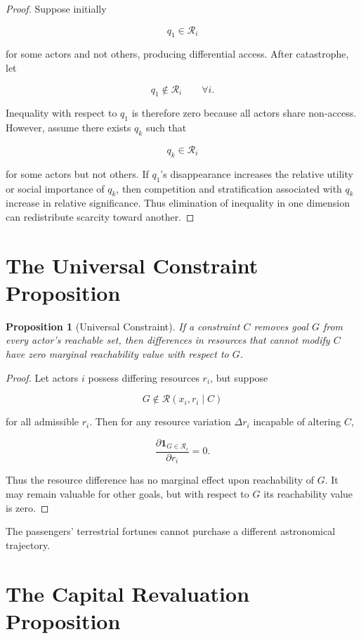 \documentclass[11pt,oneside]{book}
\newtheorem{proposition}[theorem]{Proposition}
\theoremstyle{definition}
\theoremstyle{remark}
\newcommand{\R}{\mathcal{R}}
\begin{document}
\begin{proof}
Suppose initially

\[
q_1\in\R_i
\]

for some actors and not others, producing differential access. After catastrophe, let

\[
q_1\notin\R_i
\qquad
\forall i.
\]

Inequality with respect to \(q_1\) is therefore zero because all actors share non-access. However, assume there exists \(q_k\) such that

\[
q_k\in\R_i
\]

for some actors but not others. If \(q_1\)'s disappearance increases the relative utility or social importance of \(q_k\), then competition and stratification associated with \(q_k\) increase in relative significance. Thus elimination of inequality in one dimension can redistribute scarcity toward another.
\end{proof}

\section{The Universal Constraint Proposition}

\begin{proposition}[Universal Constraint]
If a constraint \(C\) removes goal \(G\) from every actor's reachable set, then differences in resources that cannot modify \(C\) have zero marginal reachability value with respect to \(G\).
\end{proposition}

\begin{proof}
Let actors \(i\) possess differing resources \(r_i\), but suppose

\[
G\notin\R(x_i,r_i\mid C)
\]

for all admissible \(r_i\). Then for any resource variation \(\Delta r_i\) incapable of altering \(C\),

\[
\frac{\partial
\mathbf 1_{G\in\R_i}}
{\partial r_i}
=
0.
\]

Thus the resource difference has no marginal effect upon reachability of \(G\). It may remain valuable for other goals, but with respect to \(G\) its reachability value is zero.
\end{proof}

The passengers' terrestrial fortunes cannot purchase a different astronomical trajectory.

\section{The Capital Revaluation Proposition}
\end{document}
